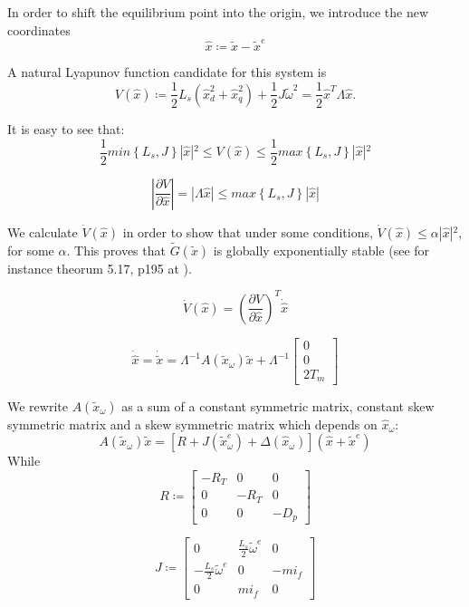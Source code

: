 \documentclass[letterpaper, 10 pt, conference]{ieeeconf}
\begin{document}
In order to shift the equilibrium point into the origin, we introduce the new  coordinates
$$
\hat{x}\coloneqq\tilde{x}-\tilde{x}^{e}
$$

A natural Lyapunov function candidate for this system is 
$$
V(\hat{x})\coloneqq\frac{1}{2}L_{s}\left(\hat{x}_{d}^{2}+\hat{x}_{q}^{2}\right)+\frac{1}{2}J\tilde{\omega}^{2}=\frac{1}{2}\hat{x}^{T}\varLambda\hat{x}.
$$

It is easy to see that:
$$
\frac{1}{2} min\left\{L_{s},J\right\}|\hat{x}|{}^{2}\leq V(\hat{x})\leq \frac{1}{2} max\left\{L_{s},J\right\}|\hat{x}|{}^{2}
$$

$$
\left|\frac{\partial V}{\partial\hat{x}}\right|=\left|\varLambda\hat{x}\right|\leq max\left\{L_{s},J\right\}\left|\hat{x}\right|
$$

We calculate $\dot{V}(\hat{x})$ in order to show that under some
conditions, $\dot{V}(\hat{x})\leq\alpha|\hat{x}|{}^{2}$, for some
$\alpha.$ This  proves that $\tilde{G}(\tilde{x})$ is globally
exponentially stable (see for instance theorum 5.17, p195 at \cite{Sastry}).

$$
\dot{V}(\hat{x})=\left(\frac{\partial V}{\partial\hat{x}}\right)^{T}\dot{\hat{x}}
$$

\begin{equation}
\dot{\hat{x}}=\dot{\tilde{x}}=\varLambda^{-1}A(\tilde{x}_\omega)\tilde{x}+\varLambda^{-1}\left[\begin{array}{c}
0\\
0\\
2T_{m}
\end{array}\right]\label{eq:x_hat_dynamic}
\end{equation}
 
We rewrite  $A(\tilde{x}_{\omega})$ as a sum of a constant symmetric
matrix, constant skew symmetric matrix and a skew symmetric matrix
which depends on $\hat{x}_{\omega}$:
$$ 
A(\tilde{x}_{\omega})\tilde{x}=\left[R+J(\tilde{x}_{\omega}^{e})+\Delta(\hat{x}_{\omega})\right](\hat{x}+\tilde{x}^{e})
$$
While
$$
R\coloneqq\left[\begin{array}{ccc}
-R_T & 0 & 0\\
0 & -R_T & 0\\
0 & 0 & -D_{p}
\end{array}\right]
$$

$$
J\coloneqq\left[\begin{array}{ccc}
0 & \frac{L_{s}}{2}\tilde{\omega}^{e} & 0\\
-\frac{L_{s}}{2}\tilde{\omega}^{e} & 0 & -mi_f\\
0 & mi_{f} & 0
\end{array}\right]
$$
\end{document}
